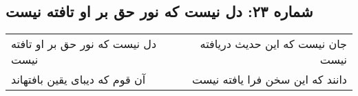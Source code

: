 \begin{center}
\section*{شماره ۲۳: دل نیست که نور حق بر او تافته نیست}
\label{sec:023}
\begin{longtable}{l p{0.5cm} r}
دل نیست که نور حق بر او تافته نیست
&&
جان نیست که این حدیث دریافته نیست
\\
آن قوم که دیبای یقین بافتهاند
&&
دانند که این سخن فرا یافته نیست
\\
\end{longtable}
\end{center}
